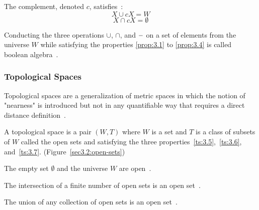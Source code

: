 \documentclass[a4paper,11pt,oneside]{article}
\newcommand{\minus}{\scalebox{0.9}[1.0]{$-$}} %
\begin{document}
\begin{property}
	\label{prop:3.4}
	The complement, denoted $c$, satisfies~\cite{mansfield_1987}:
	\begin{equation*}	
		X \cup cX = W
	\end{equation*}
	\begin{equation*}
		X \cap cX = \emptyset
	\end{equation*}
\end{property}


    
\begin{definition}
	Conducting the three operations $\cup$, $\cap$, and $\minus$ on a set of elements from the universe $W$ while satisfying the properties \eqref{prop:3.1} to \eqref{prop:3.4} is called boolean algebra~\cite{Requicha1978MathematicalFO}.
\end{definition}
    
\subsubsection{Topological Spaces}
    
Topological spaces are a generalization of metric spaces in which the notion of "nearness" is introduced but not in any quantifiable way that requires a direct distance definition~\cite{mansfield_1987}.
    
\begin{definition}
	A topological space is a pair $(W, T)$ where $W$ is a set and $T$ is a class of subsets of $W$ called the open sets and satisfying the three properties~\ref{ts:3.5},~\ref{ts:3.6}, and~\ref{ts:3.7}. (Figure~\ref{sec3.2:open-sets})
	\begin{property}
		\label{ts:3.5}
		The empty set $\emptyset$ and the universe $W$ are open~\cite{mansfield_1987}.
	\end{property}
	\begin{property}
		\label{ts:3.6}
		The intersection of a finite number of open sets is an open set~\cite{mansfield_1987}.
	\end{property}
	\begin{property}
		\label{ts:3.7}
		The union of any collection of open sets is an open set~\cite{mansfield_1987}.
	\end{property}
\end{definition}
\end{document}
